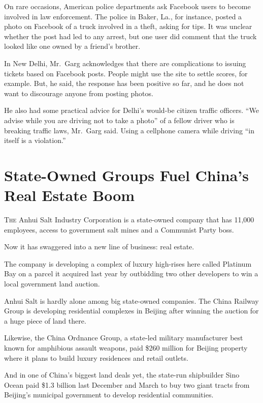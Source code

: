 ﻿\documentclass[12pt]{article}
\begin{document}
On rare occasions, American police departments ask Facebook users to become involved in law
enforcement. The police in Baker, La., for instance, posted a photo on Facebook of a truck involved
in a theft, asking for tips. It was unclear whether the post had led to any arrest, but one user did
comment that the truck looked like one owned by a friend's brother.

In New Delhi, Mr.~Garg acknowledges that there are complications to issuing tickets based on
Facebook posts. People might use the site to settle scores, for example. But, he said, the response
has been positive so far, and he does not want to discourage anyone from posting photos.

He also had some practical advice for Delhi's would-be citizen traffic officers. ``We advise while
you are driving not to take a photo'' of a fellow driver who is breaking traffic laws, Mr.~Garg
said. Using a cellphone camera while driving ``in itself is a violation.''

\section{State-Owned Groups Fuel China's Real Estate Boom}

\lettrine{T}{he} Anhui Salt Industry Corporation is a state-owned company
that has 11,000 employees, access to government salt mines and a Communist Party boss.

Now it has swaggered into a new line of business: real estate.

The company is developing a complex of luxury high-rises here called Platinum Bay on a parcel it
acquired last year by outbidding two other developers to win a local government land auction.

Anhui Salt is hardly alone among big state-owned companies. The China Railway Group is developing
residential complexes in Beijing after winning the auction for a huge piece of land there.

Likewise, the China Ordnance Group, a state-led military manufacturer best known for amphibious
assault weapons, paid \$260 million for Beijing property where it plans to build luxury residences
and retail outlets.

And in one of China's biggest land deals yet, the state-run shipbuilder Sino Ocean paid \$1.3
billion last December and March to buy two giant tracts from Beijing's municipal government to
develop residential communities.
\end{document}
